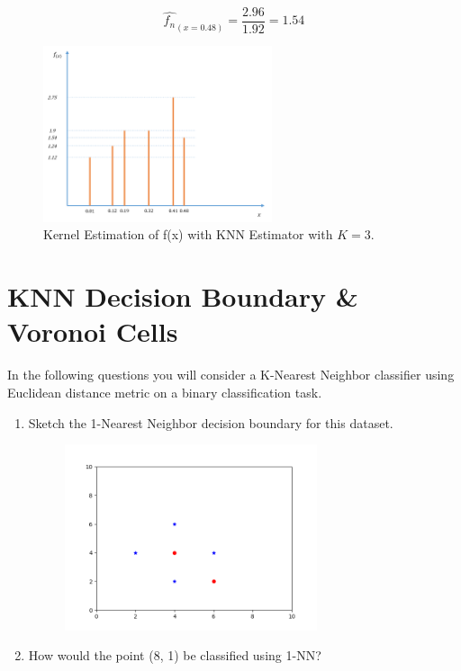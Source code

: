 \documentclass[12pt]{article}
\numberwithin{equation}{section}
\numberwithin{table}{section}
\numberwithin{figure}{section}
\begin{document}
\begin{enumerate}[label=(\alph*)]
	$$
		\hat{f_n}_{(x = 0.48)} = \frac{2.96}{1.92} = 1.54
	$$
	\begin{figure}[!h]\centering
		\includegraphics[width=0.6\textwidth]{2_b.PNG}
		\caption{Kernel Estimation of f(x) with KNN Estimator with $K = 3$.}
		\label{pl1}
	\end{figure}
\end{enumerate}

\section{KNN Decision Boundary \& Voronoi Cells}
In the following questions you will consider a K-Nearest Neighbor classifier using Euclidean distance metric on a binary classification task.

\begin{enumerate}[label=(\alph*)]
	\item Sketch the 1-Nearest Neighbor decision boundary for this dataset.
	\begin{figure}[!h]\centering
		\includegraphics[width=0.7\textwidth]{3_1.png}
		\label{pl1}
	\end{figure}


	\item How would the point (8, 1) be classified using 1-NN?
\end{enumerate}
\end{document}
